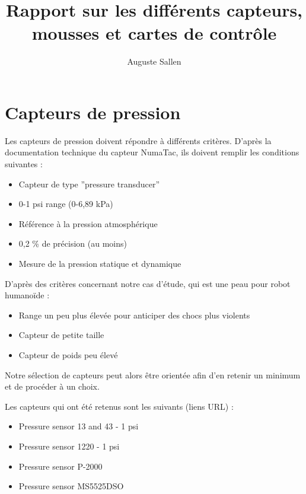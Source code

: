 \documentclass[11pt]{report}
\begin{document}
\title{Rapport sur les différents capteurs, mousses et cartes de contrôle}
\author{Auguste Sallen}
\date{}
\maketitle

\section{Capteurs de pression}

Les capteurs de pression doivent répondre à différents critères. D'après la 
documentation technique du capteur NumaTac, ils doivent remplir les conditions suivantes :

\begin{itemize}
  
  \item{Capteur de type ''pressure transducer''}
  
  \item{0-1 psi range (0-6,89 kPa)}
  
  \item{Référence à la pression atmosphérique}
  
  \item{0,2 \% de précision (au moins)}
  
  \item{Mesure de la pression statique et dynamique}
  
\end{itemize}

D'après des critères concernant notre cas d'étude, qui est une peau pour robot humanoïde :

\begin{itemize}
  
  \item{Range un peu plus élevée pour anticiper des chocs plus violents}
  
  \item{Capteur de petite taille}
  
  \item{Capteur de poids peu élevé}
  
\end{itemize}

Notre sélection de capteurs peut alors être orientée afin d'en retenir un 
minimum et de procéder à un choix.

Les capteurs qui ont été retenus sont les suivants (liens URL) :

\begin{itemize}
  
  \item{Pressure sensor 13 and 43 - 1 psi}
  
  \item{Pressure sensor 1220 - 1 psi}
  
  \item{Pressure sensor P-2000}
  
  \item{Pressure sensor MS5525DSO}
  
\end{itemize}
\end{document}
